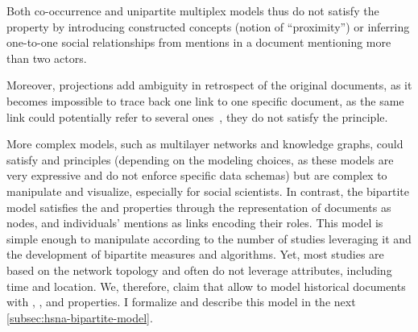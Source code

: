 Both co-occurrence and unipartite multiplex models thus do not satisfy the \reality property by introducing constructed concepts (notion of ``proximity'') or inferring one-to-one social relationships from mentions in a document mentioning more than two actors.

Moreover, projections add ambiguity in retrospect of the original documents, as it becomes impossible to trace back one link to one specific document, as the same link could potentially refer to several ones~\cite{cristofoliAuxSourcesGrands2008}, \ie they do not satisfy the \traceability principle.

More complex models, such as multilayer networks and knowledge graphs, could satisfy \reality and \traceability principles (depending on the modeling choices, as these models are very expressive and do not enforce specific data schemas) but are complex to manipulate and visualize, especially for social scientists.
In contrast, the bipartite model satisfies the \reality and \traceability properties through the representation of documents as nodes, and individuals' mentions as links encoding their roles.
This model is simple enough to manipulate according to the number of \sna studies leveraging it \cite{lippPetitionsSocialContext2001, shafieHypergraphRepresentationsStudy2017, davisDeepSouthSocial2009, ochabDetectingOttokarII2022} and the development of \sna bipartite measures and algorithms\cite{borgattiSocialNetworkAnalysis2009, latapyBasicNotionsAnalysis2008, hambergerScanningPatternsRelationship2014}.
Yet, most \hsna studies are based on the network topology and often do not leverage attributes, including time and location.
We, therefore, claim that \modelplural allow to model historical documents with \traceability, \reality, and \simplicity properties.
I formalize and describe this model in the next \autoref{subsec:hsna-bipartite-model}.



